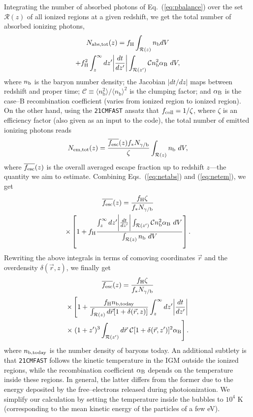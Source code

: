 \documentclass[aps,prd,twocolumn,floatfix,showpacs,superscriptaddress,nofootinbib]{revtex4-1}
\newcommand{\beq}{\begin{equation}}
\newcommand{\eeq}{\end{equation}}
\newcommand{\bga}{\begin{gathered}}
\newcommand{\ega}{\end{gathered}}
\begin{document}
Integrating the number of absorbed photons of Eq.~(\ref{eq:pbalance}) over the set $\mathcal{R}(z)$ of all ionized regions at a given redshift, we get the total number of absorbed ionizing photons,
\beq
\bga
N_{\rm abs, tot}(z) = f_{\rm H} \int_{\mathcal{R}(z)} n_{\rm b} dV  \\
  + f_{\rm H}^2 \int_z^\infty dz^\prime \biggr\vert \frac{dt}{dz^\prime} \biggr\vert \int_{\mathcal{R}(z^\prime)} \mathcal{C} n_{\rm b}^2 \alpha_{\rm B} \ dV , 
\ega
\label{eq:netabs}
\eeq
where $n_{\rm b}$ is the baryon number density; the Jacobian $|dt/dz|$ maps between redshift and proper time; $\mathcal{C} \equiv \langle n_\text{b}^2 \rangle/\langle n_\text{b} \rangle^2$ is the clumping factor; and $\alpha_{\rm B}$ is the case--B recombination coefficient (varies from ionized region to ionized region). On the other hand, using the \texttt{21CMFAST} ansatz that $f_{\rm coll} = 1/\zeta$, where $\zeta$ is an efficiency factor (also given as an input to the code), the total number of emitted ionizing photons reads
\beq
\bga
N_{\rm em, tot}(z)  = \frac{ \overline{f_{\rm esc}}(z) f_\ast N_{\gamma/{\rm b}} }{\zeta} \int_{\mathcal{R}(z)}  n_{\rm b} \ dV,
\ega 
\label{eq:netem}
\eeq
where $\overline{f_{\rm esc}}(z)$ is the overall averaged escape fraction up to redshift $z$---the quantity we aim to estimate. Combining Eqs.~(\ref{eq:netabs}) and (\ref{eq:netem}), we get
\beq
\bga
  \overline{f_{\rm esc}}(z) = \frac{f_{\rm H} \zeta}{ f_\ast N_{\gamma/{\rm b} } } \\
\times\left[ 1 + f_{\rm H} \frac{ \int_z^\infty dz^\prime \biggr\vert \frac{dt}{dz^\prime} \biggr\vert \int_{\mathcal{R}(z^\prime)} \mathcal{C} n_{\rm b}^2 \alpha_{\rm B} \ dV  }{ \int_{\mathcal{R}(z)} n_{\rm b} \ dV} \right].
\ega
\eeq
Rewriting the above integrals in terms of comoving coordinates $\vec r$ and the overdensity $\delta(\vec r, z)$, we finally get
\vspace{-5pt}
\beq
\bga
\overline{f_{\rm esc}}(z) = \frac{f_{\rm H} \zeta}{ f_\ast N_{\gamma/{\rm b} } } \\
\times  \left[ 1 + \frac{ f_{\rm H} n_{\rm b, \text{today}} }{ \int_{ \mathcal{R}(z)} d\vec r[1 + \delta(\vec r, z)] } \int_z^\infty dz^\prime \biggr\vert \frac{dt}{dz^\prime} \biggr\vert \right.\\
\times \left. (1 + z^\prime)^3 \int_{\mathcal{R}(z^\prime)} d\vec r \ \mathcal{C} [1 + \delta(\vec r, z^\prime)]^2 \alpha_{\rm B} \right] .
\ega
\eeq 
where $n_{\rm b, \text{today}}$ is the number density of baryons today. An additional subtlety is that \texttt{21CMFAST} follows the kinetic temperature in the IGM outside the ionized regions, while the recombination coefficient $\alpha_{\rm B}$ depends on the temperature inside these regions. In general, the latter differs from the former due to the energy deposited by the free--electrons released during photoionization. We simplify our calculation by setting the temperature inside the bubbles to $10^4$ K (corresponding to the mean kinetic energy of the particles of a few eV). 



\end{document}
